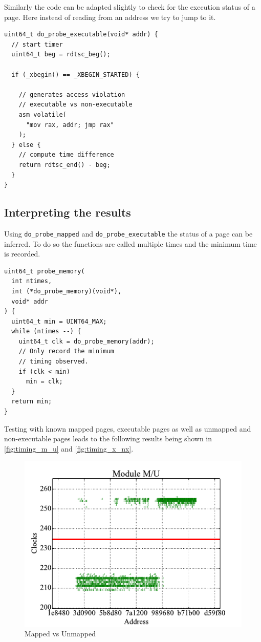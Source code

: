 Similarly the code can be adapted slightly to check for the execution status of a page.
Here instead of reading from an address we try to jump to it.

\begin{lstlisting}
uint64_t do_probe_executable(void* addr) {
  // start timer
  uint64_t beg = rdtsc_beg();

  if (_xbegin() == _XBEGIN_STARTED) {

    // generates access violation
    // executable vs non-executable
    asm volatile(
      "mov rax, addr; jmp rax"
    );
  } else {
    // compute time difference
    return rdtsc_end() - beg;
  }
}
\end{lstlisting}

\subsection{Interpreting the results}

Using \lstinline{do_probe_mapped} and \lstinline{do_probe_executable} the status of a page can be inferred.
To do so the functions are called multiple times and the minimum time is recorded.

\begin{lstlisting}
uint64_t probe_memory(
  int ntimes,
  int (*do_probe_memory)(void*),
  void* addr
) {
  uint64_t min = UINT64_MAX;
  while (ntimes --) {
    uint64_t clk = do_probe_memory(addr);
    // Only record the minimum
    // timing observed.
    if (clk < min)
      min = clk;
  }
  return min;
}
\end{lstlisting}

Testing with known mapped pages, executable pages as well as unmapped and non-executable pages leads to the following results being shown in \autoref{fig:timing_m_u} and \autoref{fig:timing_x_nx}.

\begin{figure}[h]
  \begin{center}
    \includegraphics[page=1,width=.4\textwidth]{fig/prebuilt_results_M_U}
  \end{center}
  \caption{Mapped vs Unmapped}
  \label{fig:timing_m_u}
\end{figure}

